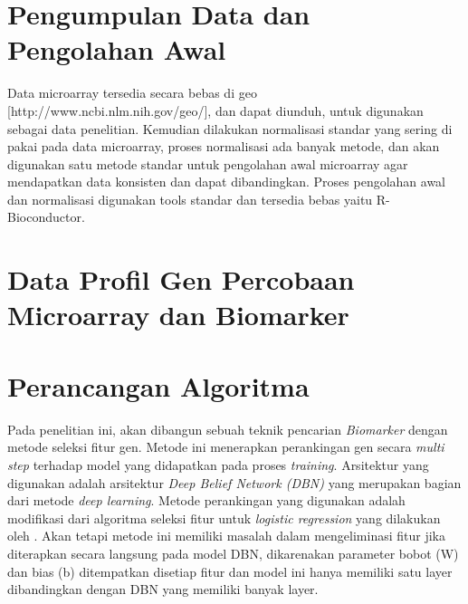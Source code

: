 \section{Pengumpulan Data dan Pengolahan Awal}
Data microarray tersedia secara bebas di geo [http://www.ncbi.nlm.nih.gov/geo/], dan dapat diunduh, untuk digunakan sebagai data penelitian. Kemudian dilakukan normalisasi standar yang sering di pakai pada data microarray, proses normalisasi ada banyak metode, dan akan digunakan satu metode standar untuk pengolahan awal microarray agar mendapatkan data konsisten dan dapat dibandingkan. Proses pengolahan awal dan normalisasi digunakan tools standar dan tersedia bebas yaitu R-Bioconductor. \\


\section{Data Profil Gen Percobaan Microarray dan Biomarker}

\section{Perancangan Algoritma}
Pada penelitian ini, akan dibangun sebuah teknik pencarian \textit{Biomarker} dengan metode seleksi fitur gen. Metode ini menerapkan perankingan gen secara \textit{multi step} terhadap model yang didapatkan pada proses \textit{training}. Arsitektur yang digunakan adalah arsitektur \textit{Deep Belief Network (DBN)} yang merupakan bagian dari metode \textit{deep learning}. Metode perankingan yang digunakan adalah modifikasi dari algoritma seleksi fitur untuk \textit{logistic regression} yang dilakukan oleh \cite{shevade2003simple}. Akan tetapi metode ini memiliki masalah dalam  mengeliminasi fitur jika diterapkan secara langsung pada model DBN, dikarenakan parameter bobot (W) dan bias (b) ditempatkan disetiap fitur dan model ini hanya memiliki satu layer dibandingkan dengan DBN yang memiliki banyak layer. \\



